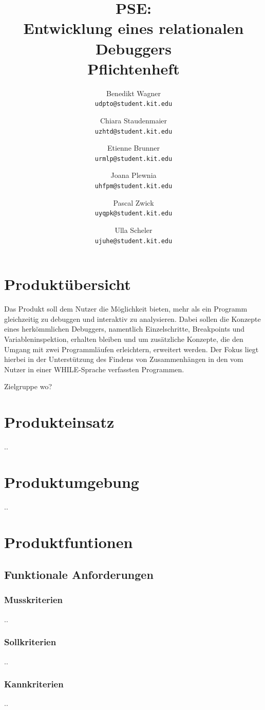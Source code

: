 \documentclass[parskip=full]{scrartcl}
\title{PSE:\\ Entwicklung eines relationalen Debuggers\\ Pflichtenheft}
\author{
	Benedikt Wagner\\
	\texttt{udpto@student.kit.edu}
	\and Chiara Staudenmaier\\
	\texttt{uzhtd@student.kit.edu}
	\and Etienne Brunner\\
	\texttt{urmlp@student.kit.edu}
	\and Joana Plewnia\\
	\texttt{uhfpm@student.kit.edu} 
	\and Pascal Zwick\\
	\texttt{uyqpk@student.kit.edu}
	\and Ulla Scheler\\
	\texttt{ujuhe@student.kit.edu}
}
\begin{document}
\maketitle
\newpage

\tableofcontents
\newpage

\section{Produktübersicht}
Das Produkt soll dem Nutzer die Möglichkeit bieten, mehr als ein Programm gleichzeitig zu debuggen und interaktiv zu analysieren. Dabei sollen die Konzepte eines herkömmlichen Debuggers, namentlich Einzelschritte, Breakpoints und Variableninspektion, erhalten bleiben und um zusätzliche Konzepte, die den Umgang mit zwei Programmläufen erleichtern, erweitert werden. Der Fokus liegt hierbei in der Unterstützung des Findens von Zusammenhängen in den vom Nutzer in einer WHILE-Sprache verfassten Programmen.

Zielgruppe wo?

\section{Produkteinsatz}
..

\section{Produktumgebung}
..

\section{Produktfuntionen}
	\subsection{Funktionale Anforderungen}
		\subsubsection{Musskriterien}
		..
		\subsubsection{Sollkriterien}
		..
		\subsubsection{Kannkriterien}
		..
\end{document}
